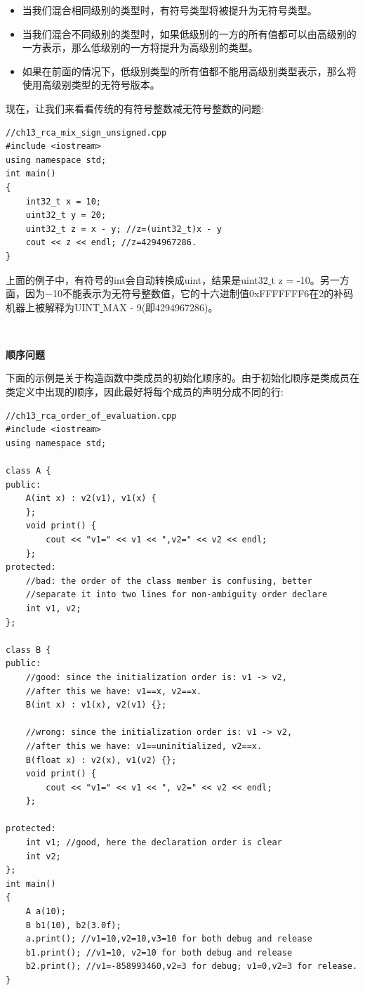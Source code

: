 \begin{itemize}
	\item 当我们混合相同级别的类型时，有符号类型将被提升为无符号类型。
	\item 当我们混合不同级别的类型时，如果低级别的一方的所有值都可以由高级别的一方表示，那么低级别的一方将提升为高级别的类型。
	\item 如果在前面的情况下，低级别类型的所有值都不能用高级别类型表示，那么将使用高级别类型的无符号版本。
\end{itemize}

现在，让我们来看看传统的有符号整数减无符号整数的问题: \par

\begin{lstlisting}[caption={}]
//ch13_rca_mix_sign_unsigned.cpp
#include <iostream>
using namespace std;
int main()
{
	int32_t x = 10;
	uint32_t y = 20;
	uint32_t z = x - y; //z=(uint32_t)x - y
	cout << z << endl; //z=4294967286.
}
\end{lstlisting}

上面的例子中，有符号的int会自动转换成uint，结果是uint32\underline{ }t z = -10。另一方面，因为−10不能表示为无符号整数值，它的十六进制值0xFFFFFFF6在2的补码机器上被解释为UINT\underline{ }MAX - 9(即4294967286)。 \par

\noindent\textbf{}\ \par
\textbf{顺序问题} \ \par
下面的示例是关于构造函数中类成员的初始化顺序的。由于初始化顺序是类成员在类定义中出现的顺序，因此最好将每个成员的声明分成不同的行: \par

\begin{lstlisting}[caption={}]
//ch13_rca_order_of_evaluation.cpp
#include <iostream>
using namespace std;

class A {
public:
	A(int x) : v2(v1), v1(x) {
	};
	void print() {
		cout << "v1=" << v1 << ",v2=" << v2 << endl;
	};
protected:
	//bad: the order of the class member is confusing, better
	//separate it into two lines for non-ambiguity order declare
	int v1, v2;
};

class B {
public:
	//good: since the initialization order is: v1 -> v2,
	//after this we have: v1==x, v2==x.
	B(int x) : v1(x), v2(v1) {};
	
	//wrong: since the initialization order is: v1 -> v2,
	//after this we have: v1==uninitialized, v2==x.
	B(float x) : v2(x), v1(v2) {};
	void print() {
		cout << "v1=" << v1 << ", v2=" << v2 << endl;
	};

protected:
	int v1; //good, here the declaration order is clear
	int v2;
};
int main()
{
	A a(10);
	B b1(10), b2(3.0f);
	a.print(); //v1=10,v2=10,v3=10 for both debug and release
	b1.print(); //v1=10, v2=10 for both debug and release
	b2.print(); //v1=-858993460,v2=3 for debug; v1=0,v2=3 for release.
}
\end{lstlisting}

